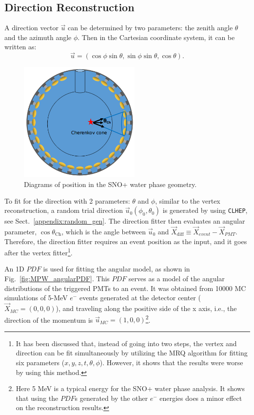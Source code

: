 \subsection{Direction Reconstruction}\label{sect:waterDirection}
A direction vector $\vec{u}$ can be determined by two parameters: the zenith angle $\theta$ and the azimuth angle $\phi$. Then in the Cartesian coordinate system, it can be written as: 
\begin{equation}
\vec{u}=(\cos\phi\sin\theta,\sin\phi\sin\theta,\cos\theta).
\end{equation}

\begin{figure}[htbp]
	\centering
	\includegraphics[width=6cm]{mpwDiagram2.png}
	\caption{Diagrams of position in the SNO+ water phase geometry.}
	\label{mpwdiagram_direction}
\end{figure}
To fit for the direction with 2 parameters: $\theta$ and $\phi$, similar to the vertex reconstruction, a random trial direction $\vec{u}_0(\phi_0,\theta_0)$ is generated by using \texttt{CLHEP}, see Sect.~\ref{appendix:random_gen}. The direction fitter then evaluates an angular parameter, $\cos\theta_{\mathrm{Ch}}$, which is the angle between $\vec{u}_{0}$ and $\vec{X}_{{\mathrm{diff}}}\equiv \vec{X}_{event}-\vec{X}_{PMT}$. Therefore, the direction fitter requires an event position as the input, and it goes after the vertex fitter\footnote{It has been discussed that, instead of going into two steps, the vertex and direction can be fit simultaneously by utilizing the MRQ algorithm for fitting six parameters ($x,y,z,t,\theta,\phi$). However, it shows that the results were worse by using this method.}.

An 1D $PDF$ is used for fitting the angular model, as shown in Fig.~\ref{fig:MPW_angularPDF}. This $PDF$ serves as a model of the angular distributions of the triggered PMTs to an event. It was obtained from 10000 MC simulations of 5-MeV $e^-$ events generated at the detector center ($\vec{X}_{MC}=(0,0,0)$), and traveling along the positive side of the x axis, i.e., the direction of the momentum is $\vec{u}_{MC}=(1,0,0)$\footnote{Here 5 MeV is a typical energy for the SNO+ water phase analysis. It shows that using the $PDF$s generated by the other $e^-$ energies does a minor effect on the reconstruction results.}.

